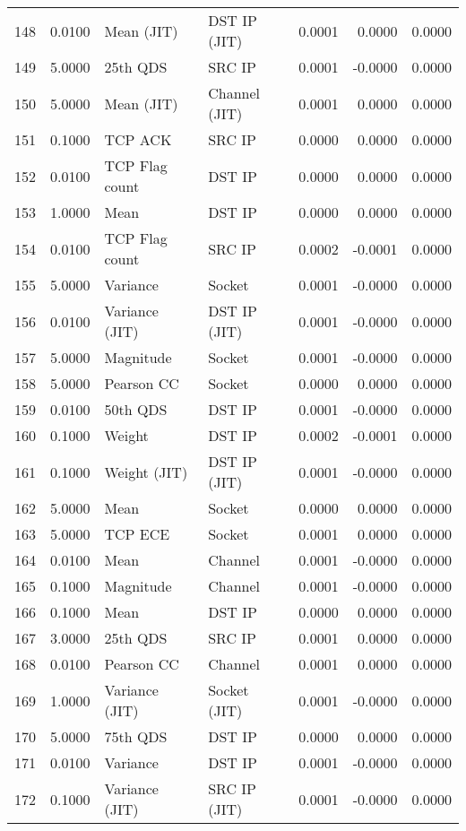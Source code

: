 \begin{longtable}{lrllrrr}
148 & 0.0100 & Mean (JIT) & DST IP (JIT) & 0.0001 & 0.0000 & 0.0000 \\
149 & 5.0000 & 25th QDS & SRC IP & 0.0001 & -0.0000 & 0.0000 \\
150 & 5.0000 & Mean (JIT) & Channel (JIT) & 0.0001 & 0.0000 & 0.0000 \\
151 & 0.1000 & TCP ACK & SRC IP & 0.0000 & 0.0000 & 0.0000 \\
152 & 0.0100 & TCP Flag count & DST IP & 0.0000 & 0.0000 & 0.0000 \\
153 & 1.0000 & Mean & DST IP & 0.0000 & 0.0000 & 0.0000 \\
154 & 0.0100 & TCP Flag count & SRC IP & 0.0002 & -0.0001 & 0.0000 \\
155 & 5.0000 & Variance & Socket & 0.0001 & -0.0000 & 0.0000 \\
156 & 0.0100 & Variance (JIT) & DST IP (JIT) & 0.0001 & -0.0000 & 0.0000 \\
157 & 5.0000 & Magnitude & Socket & 0.0001 & -0.0000 & 0.0000 \\
158 & 5.0000 & Pearson CC & Socket & 0.0000 & 0.0000 & 0.0000 \\
159 & 0.0100 & 50th QDS & DST IP & 0.0001 & -0.0000 & 0.0000 \\
160 & 0.1000 & Weight & DST IP & 0.0002 & -0.0001 & 0.0000 \\
161 & 0.1000 & Weight (JIT) & DST IP (JIT) & 0.0001 & -0.0000 & 0.0000 \\
162 & 5.0000 & Mean & Socket & 0.0000 & 0.0000 & 0.0000 \\
163 & 5.0000 & TCP ECE & Socket & 0.0001 & 0.0000 & 0.0000 \\
164 & 0.0100 & Mean & Channel & 0.0001 & -0.0000 & 0.0000 \\
165 & 0.1000 & Magnitude & Channel & 0.0001 & -0.0000 & 0.0000 \\
166 & 0.1000 & Mean & DST IP & 0.0000 & 0.0000 & 0.0000 \\
167 & 3.0000 & 25th QDS & SRC IP & 0.0001 & 0.0000 & 0.0000 \\
168 & 0.0100 & Pearson CC & Channel & 0.0001 & 0.0000 & 0.0000 \\
169 & 1.0000 & Variance (JIT) & Socket (JIT) & 0.0001 & -0.0000 & 0.0000 \\
170 & 5.0000 & 75th QDS & DST IP & 0.0000 & 0.0000 & 0.0000 \\
171 & 0.0100 & Variance & DST IP & 0.0001 & -0.0000 & 0.0000 \\
172 & 0.1000 & Variance (JIT) & SRC IP (JIT) & 0.0001 & -0.0000 & 0.0000 \\

\end{longtable}
